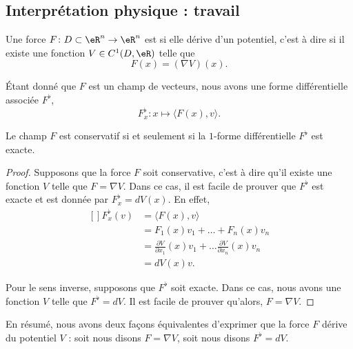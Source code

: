 \subsection{Interprétation physique : travail}

\begin{definition}
	Une force $F\colon D\subset\eR^n\to \eR^n$ est  si elle dérive d'un potentiel, c'est à dire si il existe une fonction $V\in C^1(D,\eR)$ telle que 
	\begin{equation}
		F(x)=(\nabla V)(x).
	\end{equation}
\end{definition}
Étant donné que $F$ est un champ de vecteurs, nous avons une forme différentielle associée $F^{\flat}$,
\begin{equation}
	F^{\flat}_x\colon x\mapsto \langle F(x), v\rangle .
\end{equation}

\begin{lemma}
	Le champ $F$ est conservatif si et seulement si la $1$-forme différentielle $F^{\flat}$ est exacte.
\end{lemma}

\begin{proof}
	Supposons que la force $F$ soit conservative, c'est à dire qu'il existe une fonction $V$ telle que $F=\nabla V$. Dans ce cas, il est facile de prouver que $F^{\flat}$ est exacte et est donnée par $F_x^{\flat}=dV(x)$. En effet,
	\begin{equation}
		\begin{aligned}[]
			F_x^{\flat}(v)	&=\langle F(x), v\rangle \\
					&=F_1(x)v_1+\ldots+F_n(x)v_n\\
					&=\frac{ \partial V }{ \partial x_1 }(x)v_1+\ldots\frac{ \partial V }{ \partial x_n }(x)v_n\\
					&=dV(x)v.
		\end{aligned}
	\end{equation}
	
	Pour le sens inverse, supposons que $F^{\flat}$ soit exacte. Dans ce cas, nous avons une fonction $V$ telle que $F^{\flat}=dV$. Il est facile de prouver qu'alors, $F=\nabla V$.
\end{proof}
En résumé, nous avons deux façons équivalentes d'exprimer que la force $F$ dérive du potentiel $V$ :  soit nous disons $F=\nabla V$, soit nous disons $F^{\flat}=dV$.

